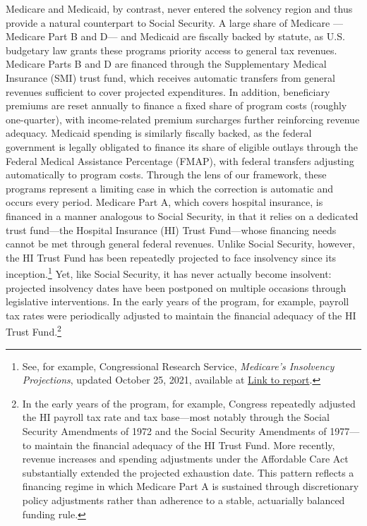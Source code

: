 \documentclass[12pt]{article}%
\theoremstyle{remark}
\begin{document}
Medicare and Medicaid, by contrast, never entered the solvency region and thus provide a natural counterpart to Social Security. A large share of Medicare ---Medicare Part B and D--- and Medicaid are fiscally backed by statute, as U.S. budgetary law grants these programs priority access to general tax revenues. Medicare Parts B and D are financed through the Supplementary Medical Insurance (SMI) trust fund, which receives automatic transfers from general revenues sufficient to cover projected expenditures. In addition, beneficiary premiums are reset annually to finance a fixed share of program costs (roughly one-quarter), with income-related premium surcharges further reinforcing revenue adequacy. Medicaid spending is similarly fiscally backed, as the federal government is legally obligated to finance its share of eligible outlays through the Federal Medical Assistance Percentage (FMAP), with federal transfers adjusting automatically to program costs. Through the lens of our framework, these programs represent a limiting case in which the correction is automatic and occurs every period.
Medicare Part A, which covers hospital insurance, is financed in a manner analogous to Social Security, in that it relies on a dedicated trust fund—the Hospital Insurance (HI) Trust Fund—whose financing needs cannot be met through general federal revenues. Unlike Social Security, however, the HI Trust Fund has been repeatedly projected to face insolvency since its inception.\footnote{See, for example, Congressional Research Service, \emph{Medicare’s Insolvency Projections}, updated October 25, 2021, available at \href{https://www.congress.gov/crs_external_products/RS/HTML/RS20946.web.html}{Link to report}.} Yet, like Social Security, it has never actually become insolvent: projected insolvency dates have been postponed on multiple occasions through legislative interventions. In the early years of the program, for example, payroll tax rates were periodically adjusted to maintain the financial adequacy of the HI Trust Fund.\footnote{In the early years of the program, for example, Congress repeatedly adjusted the HI payroll tax rate and tax base—most notably through the Social Security Amendments of 1972 and the Social Security Amendments of 1977---to maintain the financial adequacy of the HI Trust Fund. More recently, revenue increases and spending adjustments under the Affordable Care Act substantially extended the projected exhaustion date. This pattern reflects a financing regime in which Medicare Part A is sustained through discretionary policy adjustments rather than adherence to a stable, actuarially balanced funding rule.} 
\end{document}
